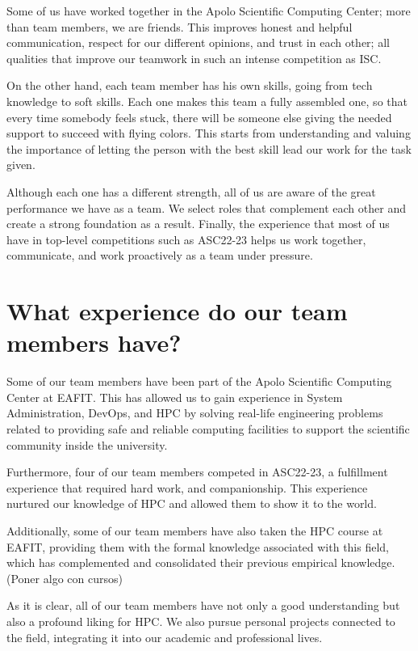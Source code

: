 \documentclass[11pt,a4paper,twocolumn]{article}
\begin{document}
    Some of us have worked together in the Apolo Scientific Computing Center; more than team members, we are friends. This improves honest and helpful communication, respect for our different opinions, and trust in each other; all qualities that improve our teamwork in such an intense competition as ISC.

    On the other hand, each team member has his own skills, going from tech knowledge to soft skills. Each one makes this team a fully assembled one, so that every time somebody feels stuck, there will be someone else giving the needed support to succeed with flying colors. This starts from understanding and valuing the importance of letting the person with the best skill lead our work for the task given.

    Although each one has a different strength, all of us are aware of the great performance we have as a team. We select roles that complement each other and create a strong foundation as a result. Finally, the experience that most of us have in top-level competitions such as ASC22-23 helps us work together, communicate, and work proactively as a team under pressure.

    \section{What experience do our team members have?}

    Some of our team members have been part of the Apolo Scientific Computing Center at EAFIT. This has allowed us to gain experience in System Administration, DevOps, and HPC by solving real-life engineering problems related to providing safe and reliable computing facilities to support the scientific community inside the university.

    Furthermore, four of our team members competed in ASC22-23, a fulfillment experience that required hard work, and companionship. This experience nurtured our knowledge of HPC and allowed them to show it to the world.

    Additionally, some of our team members have also taken the HPC course at EAFIT, providing them with the formal knowledge associated with this field, which has complemented and consolidated their previous empirical knowledge. (Poner algo con cursos)

    As it is clear, all of our team members have not only a good understanding but also a profound liking for HPC. We also pursue personal projects connected to the field, integrating it into our academic and professional lives.
\end{document}
